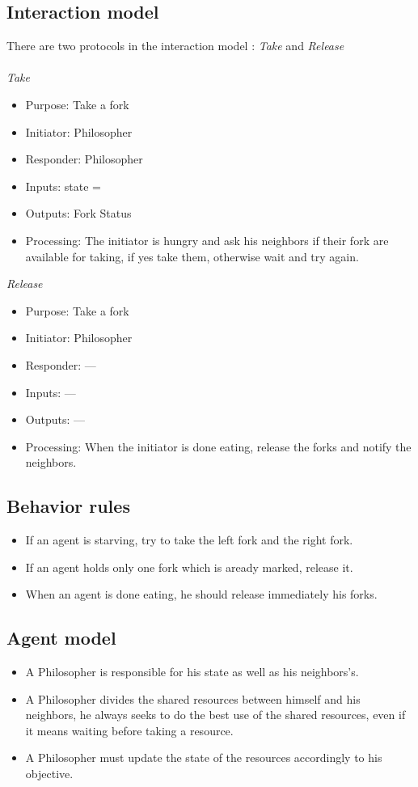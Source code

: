 \subsection{Interaction model}
There are two protocols in the interaction model : \textit{Take} and \textit{Release}\\
\\
\textit{Take}
\begin{itemize}
\item{Purpose: }Take a fork
\item{Initiator: }Philosopher
\item{Responder: }Philosopher
\item{Inputs: }state = 
\item{Outputs: }Fork Status
\item{Processing: }The initiator is hungry and ask his neighbors if their fork are available for taking, if yes take them, otherwise wait and try again.
\end{itemize}
\textit{Release}
\begin{itemize}
\item{Purpose: }Take a fork
\item{Initiator: }Philosopher
\item{Responder: }---
\item{Inputs: }---
\item{Outputs: }---
\item{Processing: }When the initiator is done eating, release the forks and notify the neighbors.
\end{itemize}

\subsection{Behavior rules}
\begin{itemize}
\item If an agent is starving, try to take the left fork and the right fork.
\item If an agent holds only one fork which is aready marked, release it.
\item When an agent is done eating, he should release immediately his forks.
\end{itemize}

\subsection{Agent model}
\begin{itemize}
\item A Philosopher is responsible for his state as well as his neighbors's.
\item A Philosopher divides the shared resources between himself and his neighbors, he always seeks to do the best use of the shared resources, even if it means waiting before taking a resource.
\item A Philosopher must update the state of the resources accordingly to his objective.
\end{itemize}
